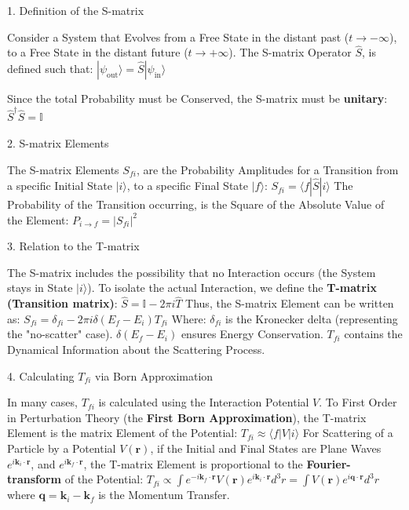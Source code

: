 \documentclass[a4paper, 10pt, onepage]{elegantbook}
\begin{document}
{    1. Definition of the S-matrix  

\noindent

Consider a System that Evolves from a Free State in the distant past ($t \to -\infty$), to a Free State in the distant 
future ($t \to +\infty$). The S-matrix Operator $\hat{S}$, is defined such that:  
$ |\psi_{\text{out}}\rangle = \hat{S} |\psi_{\text{in}}\rangle $  

Since the total Probability must be Conserved, the S-matrix must be \textbf{unitary}:
$ \hat{S}^\dagger \hat{S} = \mathbb{I} $  

    2. S-matrix Elements  

\noindent

The S-matrix Elements $S_{fi}$, are the Probability Amplitudes for a Transition from a specific Initial State 
$|i\rangle$, to a specific Final State $|f\rangle$:  
$ S_{fi} = \langle f | \hat{S} | i \rangle $  
The Probability of the Transition occurring, is the Square of the Absolute Value of the Element:  
$ P_{i \to f} = |S_{fi}|^2 $  

    3. Relation to the T-matrix  

\noindent

The S-matrix includes the possibility that no Interaction occurs (the System stays in State $|i\rangle$). To isolate 
the actual Interaction, we define the \textbf{T-matrix (Transition matrix)}:  
$ \hat{S} = \mathbb{I} - 2\pi i \hat{T} $  
Thus, the S-matrix Element can be written as:  
$ S_{fi} = \delta_{fi} - 2\pi i \delta(E_f - E_i) T_{fi} $  
Where:  
  $\delta_{fi}$ is the Kronecker delta (representing the "no-scatter" case).  
  $\delta(E_f - E_i)$ ensures Energy Conservation.  
  $T_{fi}$ contains the Dynamical Information about the Scattering Process.  

    4. Calculating $T_{fi}$ via Born Approximation  

\noindent

In many cases, $T_{fi}$ is calculated using the Interaction Potential $V$. To First Order in Perturbation Theory (the 
\textbf{First Born Approximation}), the T-matrix Element is the matrix Element of the Potential:  
$ T_{fi} \approx \langle f | V | i \rangle $  
For Scattering of a Particle by a Potential $V(\mathbf{r})$, if the Initial and Final States are Plane Waves 
$e^{i\mathbf{k}_i \cdot \mathbf{r}}$, and $e^{i\mathbf{k}_f \cdot \mathbf{r}}$, the T-matrix Element is proportional to 
the \textbf{Fourier-transform} of the Potential:  
$T_{fi} \propto \int e^{-i\mathbf{k}_f \cdot \mathbf{r}} V(\mathbf{r}) e^{i\mathbf{k}_i \cdot \mathbf{r}} d^3r = \int 
V(\mathbf{r}) e^{i\mathbf{q} \cdot \mathbf{r}} d^3r$ 
where $\mathbf{q} = \mathbf{k}_i - \mathbf{k}_f$ is the Momentum Transfer.  

}
\end{document}
